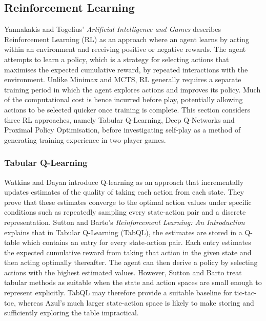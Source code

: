 \subsection{Reinforcement Learning}
Yannakakis and Togelius' \emph{Artificial Intelligence and Games} \cite{yannakakis2025artificial} describes Reinforcement Learning (RL) as an approach where an agent learns by acting within an environment and receiving positive or negative rewards. The agent attempts to learn a policy, which is a strategy for selecting actions that maximises the expected cumulative reward, by repeated interactions with the environment. Unlike Minimax and MCTS, RL generally requires a separate training period in which the agent explores actions and improves its policy. Much of the computational cost is hence incurred before play, potentially allowing actions to be selected quicker once training is complete. This section considers three RL approaches, namely Tabular Q-Learning, Deep Q-Networks and Proximal Policy Optimisation, before investigating self-play as a method of generating training experience in two-player games.

\subsubsection{Tabular Q-Learning}
Watkins and Dayan \cite{qlearning} introduce Q-learning as an approach that incrementally updates estimates of the quality of taking each action from each state. They prove that these estimates converge to the optimal action values under specific conditions such as repeatedly sampling every state-action pair and a discrete representation. Sutton and Barto's \emph{Reinforcement Learning: An Introduction} \cite{suttonbarto2018reinforcement} explains that in Tabular Q-Learning (TabQL), the estimates are stored in a Q-table which contains an entry for every state-action pair. Each entry estimates the expected cumulative reward from taking that action in the given state and then acting optimally thereafter. The agent can then derive a policy by selecting actions with the highest estimated values. However, Sutton and Barto \cite{suttonbarto2018reinforcement} treat tabular methods as suitable when the state and action spaces are small enough to represent explicitly. TabQL may therefore provide a suitable baseline for tic-tac-toe, whereas Azul's much larger state-action space is likely to make storing and sufficiently exploring the table impractical.

